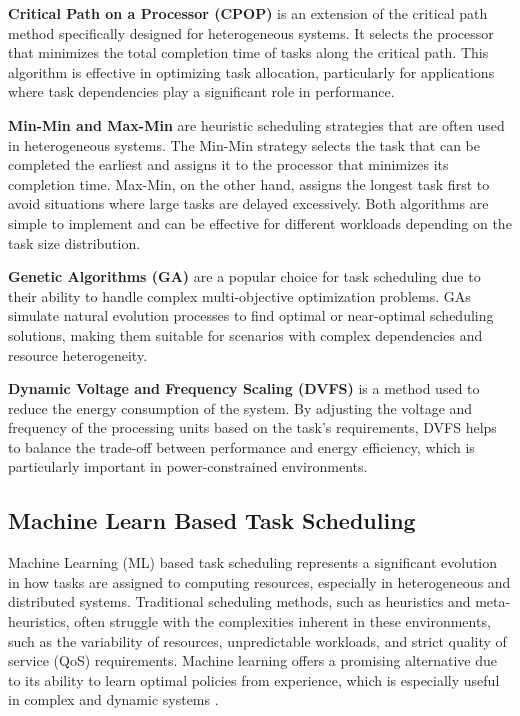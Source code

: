 \textbf{Critical Path on a Processor (CPOP)} is an extension of the critical path method specifically designed for heterogeneous systems. It selects the processor that minimizes the total completion time of tasks along the critical path. This algorithm is effective in optimizing task allocation, particularly for applications where task dependencies play a significant role in performance.

\textbf{Min-Min and Max-Min} are heuristic scheduling strategies that are often used in heterogeneous systems. The Min-Min strategy selects the task that can be completed the earliest and assigns it to the processor that minimizes its completion time. Max-Min, on the other hand, assigns the longest task first to avoid situations where large tasks are delayed excessively. Both algorithms are simple to implement and can be effective for different workloads depending on the task size distribution.

\textbf{Genetic Algorithms (GA)} are a popular choice for task scheduling due to their ability to handle complex multi-objective optimization problems. GAs simulate natural evolution processes to find optimal or near-optimal scheduling solutions, making them suitable for scenarios with complex dependencies and resource heterogeneity.

\textbf{Dynamic Voltage and Frequency Scaling (DVFS)} is a method used to reduce the energy consumption of the system. By adjusting the voltage and frequency of the processing units based on the task's requirements, DVFS helps to balance the trade-off between performance and energy efficiency, which is particularly important in power-constrained environments.

\subsection{Machine Learn Based Task Scheduling}

Machine Learning (ML) based task scheduling represents a significant evolution in how tasks are assigned to computing resources, especially in heterogeneous and distributed systems. Traditional scheduling methods, such as heuristics and meta-heuristics, often struggle with the complexities inherent in these environments, such as the variability of resources, unpredictable workloads, and strict quality of service (QoS) requirements. Machine learning offers a promising alternative due to its ability to learn optimal policies from experience, which is especially useful in complex and dynamic systems\cite{Zhou2024} . 

